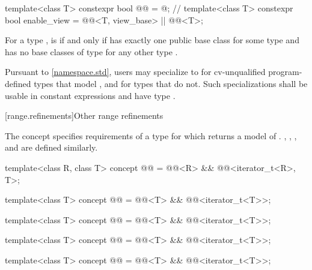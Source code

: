 %
\begin{itemdecl}
template<class T>
  constexpr bool @@ = @\seebelownc@;            // \expos
template<class T>
  constexpr bool enable_view =
    @@<T, view_base> || @@<T>;
\end{itemdecl}

\begin{itemdescr}
\pnum
For a type ,
 is 
if and only if
 has exactly one public base class 
for some type  and
 has no base classes of type 
for any other type .

\pnum
\remarks
Pursuant to \ref{namespace.std}, users may specialize 
to 
for cv-unqualified program-defined types that model ,
and  for types that do not.
Such specializations shall
be usable in constant expressions and
have type .
\end{itemdescr}

[range.refinements]{Other range refinements}

\pnum
The  concept specifies requirements of a
 type for which  returns
a model of .
, , ,
and  are defined similarly.

\begin{itemdecl}
template<class R, class T>
  concept @@ =
    @@<R> && @@<iterator_t<R>, T>;

template<class T>
  concept @@ =
    @@<T> && @@<iterator_t<T>>;

template<class T>
  concept @@ =
    @@<T> && @@<iterator_t<T>>;

template<class T>
  concept @@ =
    @@<T> && @@<iterator_t<T>>;

template<class T>
  concept @@ =
    @@<T> && @@<iterator_t<T>>;
\end{itemdecl}

